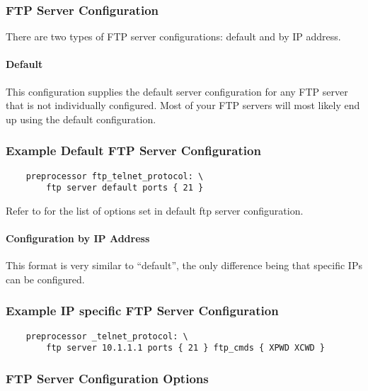 \documentclass[english]{report}
\begin{document}
\subsubsection{FTP Server Configuration}

There are two types of FTP server configurations: default and by IP address.

\paragraph{Default}

This configuration supplies the default server configuration for any FTP server
that is not individually configured.  Most of your FTP servers will most likely
end up using the default configuration.

\subsubsection{Example Default FTP Server Configuration}

\begin{verbatim}
    preprocessor ftp_telnet_protocol: \
        ftp server default ports { 21 } 
\end{verbatim}

Refer to \pageref{sub:default ftp server config} for the list of options set in default ftp server configuration.

\paragraph{Configuration by IP Address}

This format is very similar to ``default'', the only difference being that
specific IPs can be configured.

\subsubsection{Example IP specific FTP Server Configuration}

\begin{verbatim}
    preprocessor _telnet_protocol: \
        ftp server 10.1.1.1 ports { 21 } ftp_cmds { XPWD XCWD }
\end{verbatim}

\subsubsection{FTP Server Configuration Options}
\end{document}
